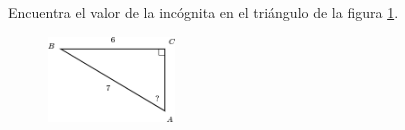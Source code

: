 Encuentra el valor de la incógnita en el triángulo de la figura \ref{fig:angle_functrig_05}.
\begin{figure}[H]
    \begin{center}
        \includegraphics[width=0.3\textwidth]{../images/angle_functrig_05.png}
    \end{center}
    \caption{}
    \label{fig:angle_functrig_05}
\end{figure}